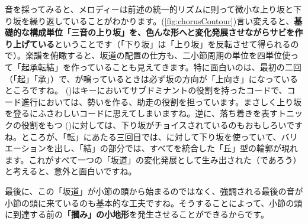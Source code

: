 \documentclass[11pt]{ltjarticle}
\begin{document}
音を採ってみると、メロディーは前述の統一的リズムに則って微小な上り坂と下り坂を繰り返していることがわかります。(\autoref{fig:chorusContour})言い変えると、\textbf{基礎的な構成単位「三音の上り坂」を、色んな形へと変化発展させながらサビを作り上げている}ということです（「下り坂」は「上り坂」を反転させて得られるので）。楽譜を俯瞰すると、坂道の配置の仕方も、二小節周期の単位を四単位使って「起承転結」を作っていることも見えてきます。特に面白いのは、最初の二回（「起」「承」）で、が鳴っているときは必ず坂の方向が「上向き」になっているところですね。 ()はキーにおいてサブドミナントの役割を持ったコードで、コード進行においては、勢いを作る、助走の役割を担っています。まさしく上り坂を登るにふさわしいコードに思えてしまいますね。逆に、落ち着きを表すトニックの役割をもつ ()に対しては、下り坂がチョイスされているのもおもしろいですね。ところが、「転」にあたる三回目では、に対して下り坂を使っていて、バリエーションを出し、「結」の部分では、すべてを統合した「丘」型の輪郭が現れます。これがすべて一つの「坂道」の変化発展として生み出された（であろう）と考えると、意外と面白いですね。\par
最後に、この「坂道」が小節の頭から始まるのではなく、強調される最後の音が小節の頭に来ているのも基本的な工夫ですね。そうすることによって、小節の頭に到達する前の\textbf{「摑み」の小地形}を発生させることができるからです。
\end{document}
